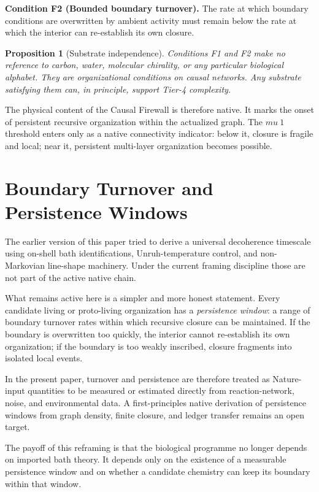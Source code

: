 \documentclass[11pt]{article}
\def\mu{mu}%
\def\approx{~}%
\newtheorem{proposition}{Proposition}
\begin{document}
\textbf{Condition F2 (Bounded boundary turnover).} The rate at which boundary conditions are overwritten by ambient activity must remain below the rate at which the interior can re-establish its own closure.

\begin{proposition}[Substrate independence]
Conditions F1 and F2 make no reference to carbon, water, molecular chirality, or any particular biological alphabet. They are organizational conditions on causal networks. Any substrate satisfying them can, in principle, support Tier-4 complexity.
\end{proposition}

The physical content of the Causal Firewall is therefore native. It marks the onset of persistent recursive organization within the actualized graph. The $\mu\approx1$ threshold enters only as a native connectivity indicator: below it, closure is fragile and local; near it, persistent multi-layer organization becomes possible.

\section{Boundary Turnover and Persistence Windows}
\label{sec:decoherence}

The earlier version of this paper tried to derive a universal decoherence timescale using on-shell bath identifications, Unruh-temperature control, and non-Markovian line-shape machinery. Under the current framing discipline those are not part of the active native chain.

What remains active here is a simpler and more honest statement. Every candidate living or proto-living organization has a \emph{persistence window}: a range of boundary turnover rates within which recursive closure can be maintained. If the boundary is overwritten too quickly, the interior cannot re-establish its own organization; if the boundary is too weakly inscribed, closure fragments into isolated local events.

In the present paper, turnover and persistence are therefore treated as Nature-input quantities to be measured or estimated directly from reaction-network, noise, and environmental data. A first-principles native derivation of persistence windows from graph density, finite closure, and ledger transfer remains an open target.

The payoff of this reframing is that the biological programme no longer depends on imported bath theory. It depends only on the existence of a measurable persistence window and on whether a candidate chemistry can keep its boundary within that window.
\end{document}
